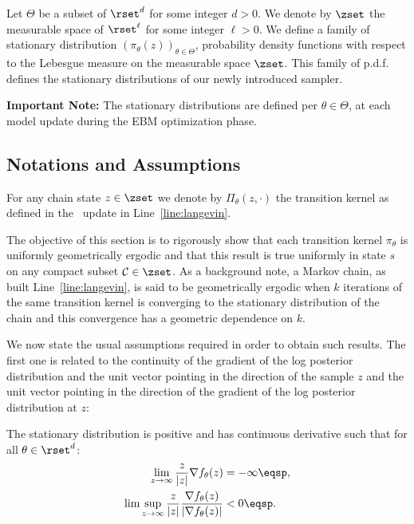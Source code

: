 \documentclass[10pt,twocolumn,letterpaper]{article}
\begin{document}
Let $\Theta$ be a subset of $\rset^d$ for some integer $d >0$.
We denote by $\zset$ the measurable space of $\rset^\ell$ for some integer $\ell >0$.
We define a family of stationary distribution $\left(\pi_\theta(z) \right)_{\theta \in \Theta}$, probability density functions with respect to the Lebesgue measure on the measurable space $\zset$. This family of p.d.f. defines the stationary distributions of our newly introduced sampler.

\textbf{Important Note:} The stationary distributions are defined per $\theta \in \Theta$, \ie at each model update during the EBM optimization phase.

\subsection{Notations and Assumptions}
For any chain state $z \in \zset$ we denote by $\Pi_\theta(z,\cdot)$ the transition kernel as defined in the \algo\ update in Line~\ref{line:langevin}.

The objective of this section is to rigorously show that each transition kernel $\pi_\theta$ is uniformly geometrically ergodic and that this result is true uniformly in state $s$ on any compact subset $\mathcal{C} \in \zset$.
As a background note, a Markov chain, as built Line~\ref{line:langevin}, is said to be geometrically ergodic when $k$ iterations of the same transition kernel is converging to the stationary distribution of the chain and this convergence has a geometric dependence on $k$.

We now state the usual assumptions required in order to obtain such results.
The first one is related to the continuity of the gradient of the log posterior distribution and the unit vector pointing in the direction of the sample $z$ and the unit vector pointing in the direction of the gradient of the log posterior distribution at $z$:
\begin{assumption}\label{ass:bounded}
The stationary distribution is positive and has continuous derivative such that for all $\theta \in \rset^d$:
\begin{equation}\notag
\begin{split}
\lim \limits_{z \to \infty} \frac{z}{|z|} \nabla f_{\theta}(z) & = - \infty \eqsp,\\
 \lim \sup \limits_{z \to \infty} \frac{z}{|z|} \frac{\nabla f_{\theta}(z) }{|\nabla f_{\theta}(z) |} &< 0 \eqsp.
\end{split}
\end{equation}
\end{assumption}
\end{document}
